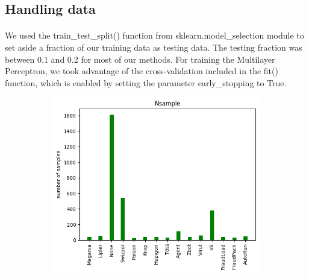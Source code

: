 \documentclass[11pt]{article}
\begin{document}
\subsection{Handling data}
\paragraph{} We used the train\_test\_split() function from sklearn.model\_selection module to set aside a fraction of our training data as testing data. The testing fraction was between 0.1 and 0.2 for most of our methods. For training the Multilayer Perceptron, we took advantage of the cross-validation included in the fit() function, which is enabled by setting the parameter early\_stopping to True.
\begin{figure}[] 
\centering
    \begin{subfigure}[!t]{0.3\textwidth}
        \includegraphics[width=\textwidth]{Plots/Nsample.png}
    \end{subfigure}
        \begin{subfigure}[!t]{0.3\textwidth}

\end{subfigure}
\end{figure}
\end{document}
